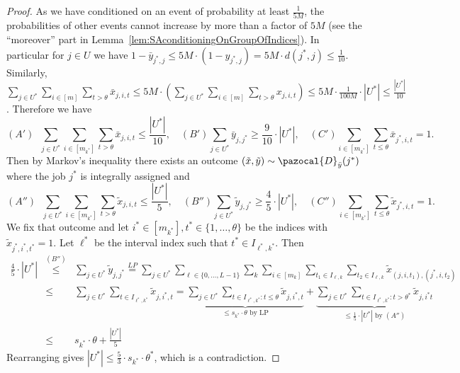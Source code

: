 \begin{proof}
  As we have conditioned on an event of probability at least $\frac{1}{5M}$, the probabilities of other events cannot increase by more than a factor of $5M$ (see the ``moreover'' part in Lemma~\ref{lem:SAconditioningOnGroupOfIndices}). 
  In particular for $j \in U$ we have $1 - \bar{y}_{j^*,j} \leq 5M \cdot (1-y_{j^*,j}) = 5M \cdot d(j^*,j) \leq \frac{1}{10}$.
  Similarly, $\sum_{j \in U^*} \sum_{i \in [m]} \sum_{t > \theta} \bar{x}_{j,i,t}  \leq 5M \cdot (\sum_{j \in U^*} \sum_{i \in [m]} \sum_{t > \theta} x_{j,i,t}) \leq 5M \cdot \frac{1}{100M} \cdot |U^*| \leq \frac{|U^*|}{10}$.
  Therefore we have 
    \[
  (A') \;\; \sum_{j \in U^*} \sum_{i \in [m_{k^*}]} \sum_{t > \theta} \bar{x}_{j,i,t}  \leq \frac{|U^*|}{10}, \quad (B')  \sum_{j \in U^*} \bar{y}_{j,j^*} \geq \frac{9}{10} \cdot |U^*|, \quad   (C') \sum_{i \in [m_{k^*}]} \sum_{t\leq \theta} \bar{x}_{j^*,i,t} = 1.
  \]
  Then by Markov's inequality there exists an outcome  $(\tilde{x},\tilde{y}) \sim \pazocal{D}_{\bar{y}}(j^*)$ where the job $j^*$ is integrally assigned and
    \[
  (A'') \;\; \sum_{j \in U^*} \sum_{i \in [m_{k^*}]} \sum_{t > \theta} \tilde{x}_{j,i,t}  \leq \frac{|U^*|}{5}, \quad (B'')  \sum_{j \in U^*} \tilde{y}_{j,j^*} \geq \frac{4}{5} \cdot |U^*|, \quad   (C'') \sum_{i \in [m_{k^*}]} \sum_{t \leq \theta} \tilde{x}_{j^*,i,t} = 1.
  \]
  We fix that outcome and let $i^* \in [m_{k^*}],t^* \in \{ 1,\ldots,\theta\}$ be the indices with $\tilde{x}_{j^*,i^*,t^*}=1$. Let $\ell^*$ be the interval index such that $t^* \in I_{\ell^*,k^*}$. 
  Then
  \begin{eqnarray*}
    \frac{4}{5} \cdot |U^*| &\stackrel{(B'')}{\leq}& \sum_{j \in U^*} \tilde{y}_{j,j^*} \stackrel{LP}{=} \sum_{j \in U^*} \sum_{\ell \in \{ 0,\ldots,L-1\}} \sum_{k} \sum_{i \in [m_k]} \sum_{t_1 \in I_{\ell,k}} \sum_{t_2 \in I_{\ell,k}} \tilde{x}_{(j,i,t_1),(j^*,i,t_2)} \\ 
    &\leq& \sum_{j \in U^*}\sum_{t \in I_{\ell^*,k^*}}\tilde{x}_{j,i^*,t}
    = \underbrace{\sum_{j \in U^*} \sum_{t \in I_{\ell^*,k^*}: t \leq \theta} \tilde{x}_{j,i^*,t}}_{\leq s_{k^*} \cdot \theta\textrm{ by LP}} + \underbrace{\sum_{j \in U^*} \sum_{t \in I_{\ell^*,k^*}:t > \theta^*} \tilde{x}_{j,i^*t}}_{\leq \frac{1}{5} \cdot |U^*| \textrm{ by }(A'')} \\
    &\leq& s_{k^*} \cdot \theta + \frac{|U^*|}{5}
  \end{eqnarray*}
  Rearranging gives $|U^*| \leq \frac{5}{3} \cdot s_{k^*} \cdot \theta^*$, which is a contradiction.
  \end{proof}
  
